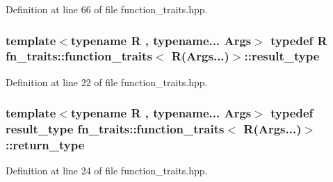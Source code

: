 Definition at line 66 of file function\+\_\+traits.\+hpp.

\subsubsection[{\texorpdfstring{result\+\_\+type}{result_type}}]{\setlength{\rightskip}{0pt plus 5cm}template$<$typename R , typename... Args$>$ typedef R {\bf fn\+\_\+traits\+::function\+\_\+traits}$<$ R(Args...)$>$\+::{\bf result\+\_\+type}\hspace{0.3cm}{\ttfamily [inherited]}}\hypertarget{structfn__traits_1_1function__traits_3_01_r_07_args_8_8_8_08_4_a1b509243ed1b4707465625de10e6c6bb}{}\label{structfn__traits_1_1function__traits_3_01_r_07_args_8_8_8_08_4_a1b509243ed1b4707465625de10e6c6bb}


Definition at line 22 of file function\+\_\+traits.\+hpp.

\subsubsection[{\texorpdfstring{return\+\_\+type}{return_type}}]{\setlength{\rightskip}{0pt plus 5cm}template$<$typename R , typename... Args$>$ typedef {\bf result\+\_\+type} {\bf fn\+\_\+traits\+::function\+\_\+traits}$<$ R(Args...)$>$\+::{\bf return\+\_\+type}\hspace{0.3cm}{\ttfamily [inherited]}}\hypertarget{structfn__traits_1_1function__traits_3_01_r_07_args_8_8_8_08_4_adf6a35a9b703dfb4778e59f132e00a9b}{}\label{structfn__traits_1_1function__traits_3_01_r_07_args_8_8_8_08_4_adf6a35a9b703dfb4778e59f132e00a9b}


Definition at line 24 of file function\+\_\+traits.\+hpp.

